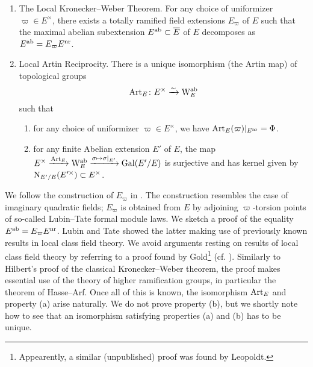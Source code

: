 \documentclass[../main.tex]{subfiles}
\begin{document}
\begin{thm}\label{thm:LocalKroneckerWeber} \leavevmode
  \vspace{-0.5em}
  \begin{enumerate}
    \item \textnormal{The Local Kronecker--Weber Theorem.} For any choice of uniformizer $\varpi \in E^\times$, there exists a 
      totally ramified field extensions $E_\varpi$ of $E$ such that 
      the maximal abelian subextension $E^{\mathrm{ab}} \subset \overline E$ of $E$
      decomposes as $E^{\mathrm{ab}} = E_\varpi E^{\mathrm{nr}}$.     
    \item \textnormal{Local Artin Reciprocity.} There is a unique isomorphism
      (the Artin map) of topological groups
      \begin{equation*}
        \mathrm{Art}_E\colon E^\times \xrightarrow{\sim} \mathrm W_E^{\mathrm{ab}}
      \end{equation*}
      such that 
      \begin{enumerate}
        \item for any choice of uniformizer $\varpi \in E^\times$, we have
          $\mathrm{Art}_E(\varpi)|_{E^{\mathrm{nr}}} = \Phi$.
        \item for any finite Abelian extension $E'$ of $E$, the
          map $E^\times \xrightarrow{\mathrm{Art}_E} \mathrm W_E^{\mathrm{ab}} \xrightarrow{\sigma \mapsto
          \sigma|_{E'}} \operatorname{Gal}(E'/E)$ is surjective and has kernel given by
          $\mathrm{N}_{E'/E}(E'^\times) \subset E^\times$. 
      \end{enumerate}
  \end{enumerate}
\end{thm}

We follow the construction of $E_\varpi$ in \cite{LubinTateFormalMult}.
The construction resembles the case of imaginary quadratic fields; $E_\varpi$ is
obtained from $E$ by adjoining $\varpi$-torsion points of so-called Lubin--Tate
formal module laws. 
We sketch a proof of the equality $E^{\mathrm{ab}} = E_\varpi E^{\mathrm{nr}}$. Lubin and Tate
showed the latter
making use of previously known results in local class field theory.
We avoid arguments resting on results of local class field theory
by referring to a proof found by Gold\footnote{Appearently, a similar
(unpublished) proof was found by Leopoldt.} (cf. \cite{gold1981local}).
Similarly to Hilbert's proof of the classical Kronecker--Weber theorem,
the proof makes essential use of the theory of higher ramification groups,
in particular the theorem of Hasse--Arf. 
Once all of this is known, the isomorphism $\mathrm{Art}_E$ and property
(a) arise naturally. We do not prove property (b), but we shortly note how to see
that an isomorphism satisfying properties (a) and (b) has to be unique.
\end{document}
